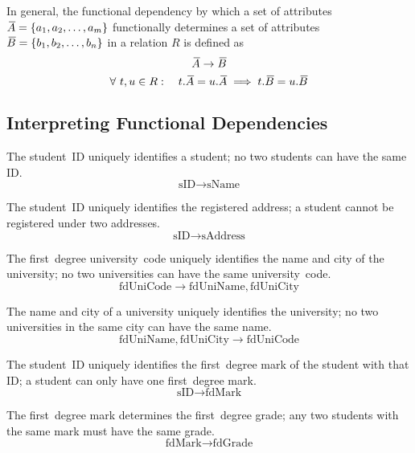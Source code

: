 In general, the functional dependency by which a set of attributes \( {}\mkern3mu\overline{\mkern-3muA} = \left\{ a_1, a_2, \ldots, a_m \right\} \) functionally determines a set of attributes \( {}\mkern3mu\overline{\mkern-3muB} = \left\{ b_1, b_2, \ldots, b_n \right\} \) in a relation \( R \) is defined as
\begin{equation*}
  {}\mkern3mu\overline{\mkern-3muA} \rightarrow {}\mkern3mu\overline{\mkern-3muB}
\end{equation*}
\begin{equation*}
  \forall\ t,u \in R: \quad t.{}\mkern3mu\overline{\mkern-3muA} = u.{}\mkern3mu\overline{\mkern-3muA} \implies t.{}\mkern3mu\overline{\mkern-3muB} = u.{}\mkern3mu\overline{\mkern-3muB}
\end{equation*}

\subsection{Interpreting Functional Dependencies}

The student~ID uniquely identifies a student; no two students can have the same ID\@.
\begin{equation*}
  \text{sID} \rightarrow \text{sName}
\end{equation*}

The student~ID uniquely identifies the registered address; a student cannot be registered under two addresses.
\begin{equation*}
  \text{sID} \rightarrow \text{sAddress}
\end{equation*}

The first~degree university~code uniquely identifies the name and city of the university; no two universities can have the same university~code.
\begin{equation*}
  \text{fdUniCode} \rightarrow \text{fdUniName}, \text{fdUniCity}
\end{equation*}

The name and city of a university uniquely identifies the university; no two universities in the same city can have the same name.
\begin{equation*}
  \text{fdUniName}, \text{fdUniCity} \rightarrow \text{fdUniCode}
\end{equation*}

The student~ID uniquely identifies the first~degree mark of the student with that ID; a student can only have one first~degree mark.
\begin{equation*}
  \text{sID} \rightarrow \text{fdMark}
\end{equation*}

The first~degree mark determines the first~degree grade; any two students with the same mark must have the same grade.
\begin{equation*}
  \text{fdMark} \rightarrow \text{fdGrade}
\end{equation*}

